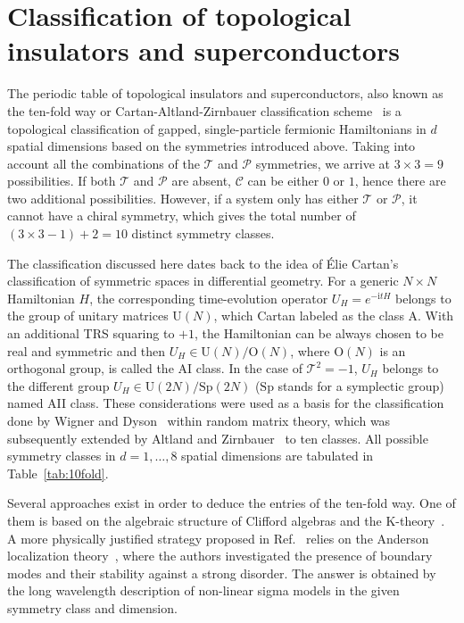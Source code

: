 \section{Classification of topological insulators and superconductors}
The periodic table of topological insulators and superconductors, also known as the ten-fold way or Cartan-Altland-Zirnbauer classification scheme~\cite{10foldSchnyder2008, 10foldRyu2010, 10foldKitaev2009} is a topological classification of gapped, single-particle fermionic Hamiltonians in $d$ spatial dimensions based on the symmetries introduced above. Taking into account all the combinations of the $\mathcal{T}$ and $\mathcal{P}$ symmetries, we arrive at $3 \times 3 = 9$ possibilities. If both $\mathcal{T}$ and $\mathcal{P}$ are absent, $\mathcal{C}$ can be either $0$ or $1$, hence there are two additional possibilities. However, if a system only has either $\mathcal{T}$ or $\mathcal{P}$, it cannot have a chiral symmetry, which gives the total number of $( 3 \times 3 - 1) + 2 = 10$ distinct symmetry classes.

The classification discussed here dates back to the idea of \'{E}lie Cartan's classification of symmetric spaces in differential geometry. For a generic $N \times N$ Hamiltonian $H$, the corresponding time-evolution operator $U_H = e^{-\mathrm{i} t H}$ belongs to the group of unitary matrices $\mathrm{U} (N)$, which Cartan labeled as the class A. With an additional TRS squaring to $+1$, the Hamiltonian can be always chosen to be real and symmetric and then $U_H \in \mathrm{U} (N) / \mathrm{O} (N)$, where $\mathrm{O} (N)$ is an orthogonal group, is called the AI class. In the case of $\mathcal{T}^2 = -1$, $U_H$ belongs to the different group $U_H \in \mathrm{U}(2N)/\mathrm{Sp}(2N)$ ($\mathrm{Sp}$ stands for a symplectic group) named AII class. These considerations were used as a basis for the classification done by Wigner and Dyson~\cite{doi:10.1063/1.1703863} within random matrix theory, which was subsequently extended by Altland and Zirnbauer~\cite{AltlandZirnbauer1997} to ten classes. All possible symmetry classes in $d = 1, \ldots, 8$ spatial dimensions are tabulated in Table~\ref{tab:10fold}. 

Several approaches exist in order to deduce the entries of the ten-fold way. One of them is based on the algebraic structure of Clifford algebras and the K-theory~\cite{10foldKitaev2009}. A more physically justified strategy proposed in Ref.~\cite{10foldRyu2010} relies on the Anderson localization theory~\cite{anderson}, where the authors investigated the presence of boundary modes and their stability against a strong disorder. The answer is obtained by the long wavelength description of non-linear sigma models in the given symmetry class and dimension.

